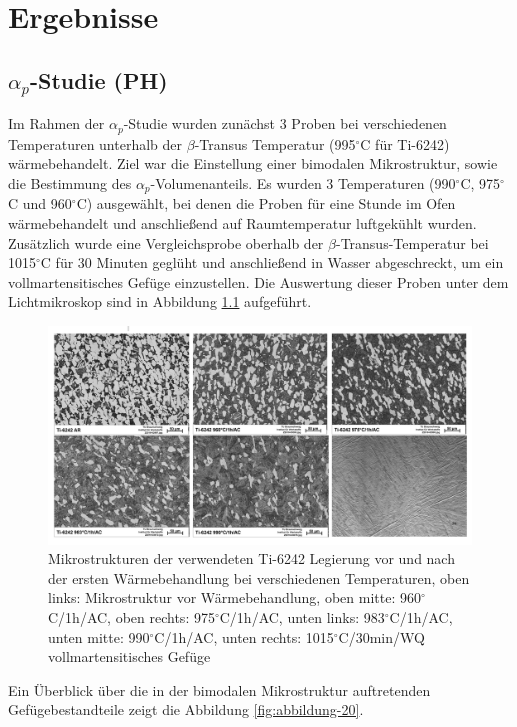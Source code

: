 \chapter {Ergebnisse}

\section{$\alpha_p$-Studie (PH)}

Im Rahmen der $\alpha_p$-Studie wurden zunächst 3 Proben bei verschiedenen Temperaturen unterhalb der $\beta$-Transus Temperatur (995$^\circ$C für Ti-6242) wärmebehandelt. Ziel war die Einstellung einer bimodalen Mikrostruktur, sowie die Bestimmung des $\alpha_p$-Volumenanteils. Es wurden 3 Temperaturen (990$^\circ$C, 975$^\circ$C und 960$^\circ$C) ausgewählt, bei denen die Proben für eine Stunde im Ofen wärmebehandelt und anschließend auf Raumtemperatur luftgekühlt wurden. Zusätzlich wurde eine Vergleichsprobe oberhalb der $\beta$-Transus-Temperatur bei 1015$^\circ$C für 30 Minuten geglüht und anschließend in Wasser abgeschreckt, um ein vollmartensitisches Gefüge einzustellen. Die Auswertung dieser Proben unter dem Lichtmikroskop sind in Abbildung \ref{fig:abbildung-8} aufgeführt. 

\begin{figure}[h]
	\centering
	\includegraphics[width=0.9\linewidth]{./Bilder/Abbildung 8}
	\caption[Abbildung 8]{Mikrostrukturen der verwendeten Ti-6242 Legierung vor und nach der ersten Wärmebehandlung bei verschiedenen Temperaturen, oben links: Mikrostruktur vor Wärmebehandlung, oben mitte: 960$^\circ$C/1h/AC, oben rechts: 975$^\circ$C/1h/AC, unten links: 983$^\circ$C/1h/AC, unten mitte: 990$^\circ$C/1h/AC, unten rechts: 1015$^\circ$C/30min/WQ vollmartensitisches Gefüge}
	\label{fig:abbildung-8}
\end{figure}

Ein Überblick über die in der bimodalen Mikrostruktur auftretenden Gefügebestandteile zeigt die Abbildung \ref{fig:abbildung-20}.

